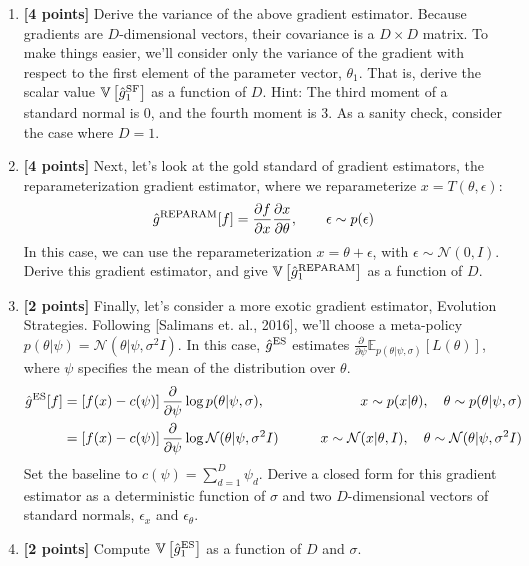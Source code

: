 \documentclass{harvardml}
\newcommand{\distNorm}{\mathcal{N}}
\newcommand{\var}{\mathbb{V}}
\newcommand{\E}{\mathbb{E}}
\theoremstyle{plain}
\begin{document}
\begin{problem}
\begin{enumerate}[label=(\alph*)]
\item {\bf [4 points]} Derive the variance of the above gradient estimator.
Because gradients are $D$-dimensional vectors, their covariance is a $D \times D$ matrix.
To make things easier, we'll consider only the variance of the gradient with respect to the first element of the parameter vector, $\theta_1$.
That is, derive the scalar value $\var \left[ \hat g^\textnormal{SF}_1 \right]$ as a function of $D$.
Hint: The third moment of a standard normal is 0, and the fourth moment is 3.
As a sanity check, consider the case where $D = 1$.

\item {\bf [4 points]} Next, let's look at the gold standard of gradient estimators, the reparameterization gradient estimator, where we reparameterize $x = T(\theta, \epsilon)$:
%
\begin{align}
\hat g^\textnormal{REPARAM}[f] = \frac{\partial f}{\partial x} \frac{\partial x}{\partial \theta}, \qquad \epsilon \sim p(\epsilon)
\end{align}
%
In this case, we can use the reparameterization $x = \theta + \epsilon$, with $\epsilon \sim \distNorm(0, I)$.
%
Derive this gradient estimator, and give $\var \left[ \hat g^\textnormal{REPARAM}_1 \right]$ as a function of $D$.

\item {\bf [2 points]} Finally, let's consider a more exotic gradient estimator, Evolution Strategies.
Following [Salimans et. al., 2016], we'll choose a meta-policy $p(\theta | \psi) = \distNorm(\theta | \psi, \sigma^2 I)$.
In this case, $\hat g^\textnormal{ES}$ estimates $\frac{\partial}{\partial \psi}\E_{p(\theta|\psi, \sigma)}\left[ L(\theta) \right]$, where $\psi$ specifies the mean of the distribution over $\theta$.
%
\begin{align}
\hat g^\textnormal{ES}[f]
& = \left[f(x) - c(\psi)\right] \frac{\partial}{\partial \psi} \log p(\theta | \psi, \sigma), 
& \qquad x \sim p(x | \theta),\quad \theta \sim p(\theta | \psi, \sigma) \\
& = \left[f(x) - c(\psi)\right] \frac{\partial}{\partial \psi} \log \distNorm(\theta | \psi, \sigma^2 I)
& \qquad x \sim \distNorm(x | \theta, I), \quad \theta \sim \distNorm(\theta | \psi, \sigma^2 I)
\end{align}
%
Set the baseline to $c(\psi) = \sum_{d=1}^D \psi_d$.
Derive a closed form for this gradient estimator as a deterministic function of $\sigma$ and two $D$-dimensional vectors of standard normals, $\epsilon_x$ and $\epsilon_\theta$.

\item {\bf [2 points]} Compute $\var \left[ \hat g^\textnormal{ES}_1 \right]$ as a function of $D$ and $\sigma$.
\end{enumerate}
\end{problem}
\end{document}
